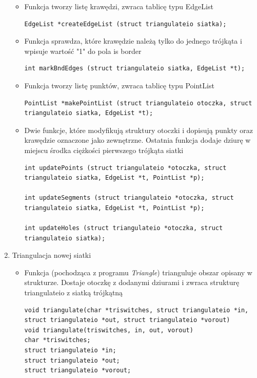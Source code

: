 \documentclass[a4paper,12pt,twoside]{article}
\begin{document}
\begin{enumerate}
\begin{itemize}
\item Funkcja tworzy listę krawędzi, zwraca tablicę typu EdgeList
\begin{lstlisting}
EdgeList *createEdgeList (struct triangulateio siatka);
\end{lstlisting} 

\item Funkcja sprawdza, które krawędzie należą tylko do jednego trójkąta i wpisuje wartość "1" do pola is border
\begin{lstlisting}
int markBndEdges (struct triangulateio siatka, EdgeList *t);
\end{lstlisting} 

\item Funkcja tworzy listę punktów, zwraca tablicę typu PointList
\begin{lstlisting}
PointList *makePointList (struct triangulateio otoczka, struct triangulateio siatka, EdgeList *t);
\end{lstlisting}

\item Dwie funkcje, które modyfikują struktury otoczki i dopisują punkty oraz krawędzie oznaczone jako zewnętrzne. Ostatnia funkcja dodaje dziurę w miejscu środka ciężkości pierwszego trójkąta siatki
\begin{lstlisting}
int updatePoints (struct triangulateio *otoczka, struct triangulateio siatka, EdgeList *t, PointList *p);

int updateSegments (struct triangulateio *otoczka, struct triangulateio siatka, EdgeList *t, PointList *p);

int updateHoles (struct triangulateio *otoczka, struct triangulateio siatka);
\end{lstlisting}

\end{itemize}

\item Triangulacja nowej siatki

\begin{itemize}
\item Funkcja (pochodząca z programu \textit{Triangle}) trianguluje obszar opisany w strukturze. Dostaje otoczkę z dodanymi dziurami i zwraca strukturę triangulateio z siatką trójkątną
\begin{lstlisting}
void triangulate(char *triswitches, struct triangulateio *in, struct triangulateio *out, struct triangulateio *vorout)
void triangulate(triswitches, in, out, vorout)
char *triswitches;
struct triangulateio *in;
struct triangulateio *out;
struct triangulateio *vorout;
\end{lstlisting}
\end{itemize}


\end{enumerate}
\end{document}
